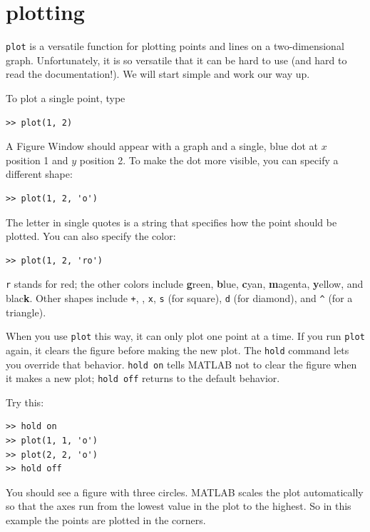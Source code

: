 \documentclass[
]{book}
\begin{document}
\section{plotting}
\label{sect:plotting}

{\tt plot} is a versatile function for plotting points and lines
on a two-dimensional graph.  Unfortunately, it is so versatile
that it can be hard to use (and hard to read the documentation!).
We will start simple and work our way up.

To plot a single point, type

\begin{verbatim}
>> plot(1, 2)
\end{verbatim}

A {\sf Figure Window} should appear with a graph and a single, blue dot
at $x$ position 1 and $y$ position 2.  To make the dot more visible,
you can specify a different shape:

\begin{verbatim}
>> plot(1, 2, 'o')
\end{verbatim}

The letter in single quotes is a string that specifies how the
point should be plotted.  You can also specify the color:

\begin{verbatim}
>> plot(1, 2, 'ro')
\end{verbatim}

{\tt r} stands for red; the other colors include {\bf g}reen, {\bf
b}lue, {\bf c}yan, {\bf m}agenta, {\bf y}ellow, and blac{\bf k}.
Other shapes include {\tt +},
{\tt *},
{\tt x},
{\tt s} (for square),
{\tt d} (for diamond), and
\verb+^+ (for a triangle).

When you use {\tt plot} this way, it can only plot one point at a
time.  If you run {\tt plot} again, it clears the figure before making
the new plot.  The {\tt hold} command lets you override that behavior.
{\tt hold on} tells MATLAB not to clear the figure when it makes a new
plot; {\tt hold off} returns to the default behavior.

Try this:

\begin{verbatim}
>> hold on
>> plot(1, 1, 'o')
>> plot(2, 2, 'o')
>> hold off
\end{verbatim}

You should see a figure with three circles.  MATLAB scales
the plot automatically so that the axes run from the lowest value in
the plot to the highest.  So in this example the points are plotted in
the corners.
\end{document}
